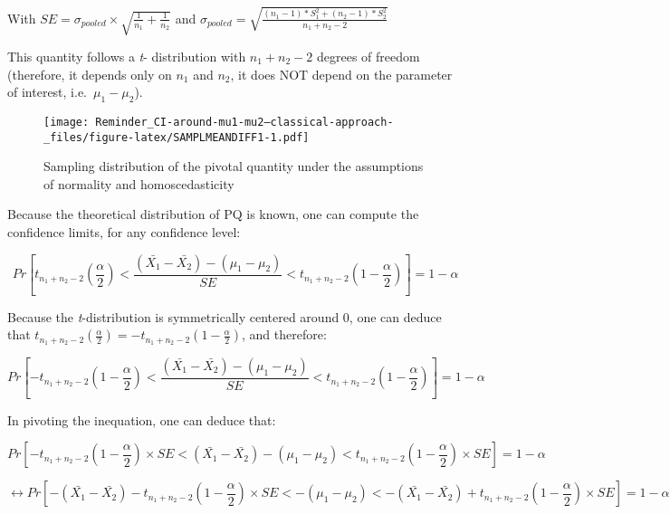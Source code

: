 \documentclass[
  man,floatsintext]{apa6}
\begin{document}
With \(SE = \sigma_{pooled} \times \sqrt{\frac{1}{n_1}+\frac{1}{n_2}}\) and \(\sigma_{pooled} = \sqrt{\frac{(n_1-1)*S^2_1+(n_2-1)*S^2_2}{n_1+n_2-2}}\)

This quantity follows a \emph{t}- distribution with \(n_1+n_2-2\) degrees of freedom (therefore, it depends only on \(n_1\) and \(n_2\), it does NOT depend on the parameter of interest, i.e.~\(\mu_1-\mu_2\)).

\begin{figure}
\centering
\texttt{[image: Reminder\_CI-around-mu1-mu2--classical-approach-\_files/figure-latex/SAMPLMEANDIFF1-1.pdf]}
\caption{\label{fig:SAMPLMEANDIFF1}Sampling distribution of the pivotal quantity under the assumptions of normality and homoscedasticity}
\end{figure}

Because the theoretical distribution of PQ is known, one can compute the confidence limits, for any confidence level:

\begin{equation} 
Pr[t_{n_1+n_2-2}(\frac{\alpha}{2}) < \frac{(\bar{X_1}-\bar{X_2})-(\mu_1-\mu_2)}{SE} < t_{n_1+n_2-2}(1-\frac{\alpha}{2})] = 1 - \alpha
\label{eq:conflev1}
\end{equation}

Because the \emph{t}-distribution is symmetrically centered around 0, one can deduce that \(t_{n_1+n_2-2}(\frac{\alpha}{2})=-t_{n_1+n_2-2}(1-\frac{\alpha}{2})\), and therefore:

\begin{equation} 
Pr[-t_{n_1+n_2-2}(1-\frac{\alpha}{2}) < \frac{(\bar{X_1}-\bar{X_2})-(\mu_1-\mu_2)}{SE} < t_{n_1+n_2-2}(1-\frac{\alpha}{2})] = 1 - \alpha
\label{eq:conflev2}
\end{equation}

In pivoting the inequation, one can deduce that:

\begin{equation} 
Pr[-t_{n_1+n_2-2}(1-\frac{\alpha}{2}) \times SE < (\bar{X_1}-\bar{X_2})-(\mu_1-\mu_2) < t_{n_1+n_2-2}(1-\frac{\alpha}{2}) \times SE] = 1-\alpha
\label{eq:conflev3}
\end{equation}

\begin{equation} 
\leftrightarrow Pr[-(\bar{X_1}-\bar{X_2}) -t_{n_1+n_2-2}(1-\frac{\alpha}{2}) \times SE <
-(\mu_1-\mu_2) 
< -(\bar{X_1}-\bar{X_2}) +t_{n_1+n_2-2}(1-\frac{\alpha}{2}) \times SE]= 1- \alpha
\label{eq:conflev4}
\end{equation}
\end{document}
